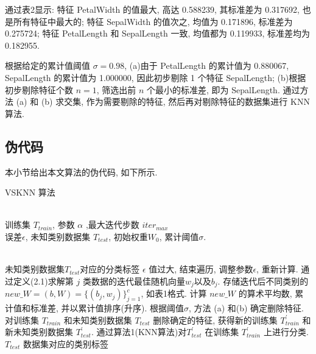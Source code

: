 \documentclass[11pt]{article}
\numberwithin{equation}{section}
\begin{document}
通过表2显示: 特征 PetalWidth 的值最大, 高达 0.588239, 其标准差为 0.317692, 也是所有特征中最大的; 特征 SepalWidth 的值次之, 均值为 0.171896, 标准差为 0.275724; 特征 PetalLength 和 SepalLength 一致, 均值都为 0.119933, 标准差均为 0.182955.

根据给定的累计值阈值 $\sigma = 0.98$, (a)由于 PetalLength 的累计值为 0.880067, SepalLength 的累计值为 1.000000, 因此初步剔除 1 个特征 SepalLength; (b)根据初步剔除特征个数 $n = 1$, 筛选出前 $n$ 个最小的标准差, 即为 SepalLength. 通过方法 (a) 和 (b) 求交集, 作为需要剔除的特征, 然后再对剔除特征的数据集进行 KNN 算法.


\subsection{伪代码}
本小节给出本文算法的伪代码, 如下所示.
\begin{algorithm}[H]   
\caption{\quad VSKNN 算法}   
\begin{algorithmic}[1] %
\REQUIRE  ~~ \\ %
训练集 $T_{train}$, 参数 $\alpha$ ,最大迭代步数 $iter_{max}$ \\
误差$\epsilon$, 未知类别数据集 $T_{test}$, 初始权重$W_{0}$, 累计阈值$\sigma$.

\ENSURE  ~~\\ %
未知类别数据集$T_{test}$对应的分类标签
\STATE $\epsilon$ 值过大, 结束遍历, 调整参数$\epsilon$, 重新计算.
\ELSE 
{}
\STATE 通过定义(2.1)求解第 $j$ 类数据的迭代最佳随机向量$w_{j}$以及$b_{j}$.
\ENDWHILE
\ENDIF
\ENDFOR
\STATE 存储迭代后不同类别的 $new\_W = (b,W) = \{(b_{j},w_{j})\}_{j=1}^{c}$, 如表1格式.
\STATE 计算 $new\_W$ 的算术平均数, 累计值和标准差, 并以累计值排序(升序).
\STATE 根据阈值$\sigma$, 方法 (a) 和(b) 确定删除特征.
\STATE 对训练集 $T_{train}$ 和未知类别数据集 $T_{test}$ 删除确定的特征, 获得新的训练集 $T^{'}_{train}$ 和新未知类别数据集 $T^{'}_{test}$.
\STATE 通过算法1(KNN算法)对$T^{'}_{test}$ 在训练集 $T^{'}_{train}$ 上进行分类.
\RETURN \\
$T_{test}$ 数据集对应的类别标签
\end{algorithmic}  
\end{algorithm}
\end{document}
